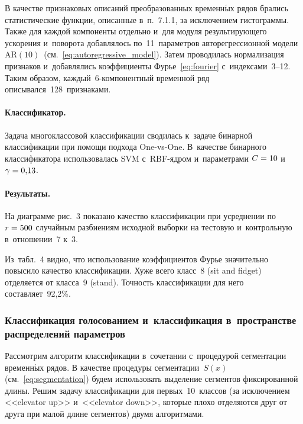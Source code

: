 \begin{multicols}{2}
В качестве признаковых описаний преобразованных временн$\acute{\mbox{ы}}$х рядов брались 
статистические функции, описанные в~п.~7.1.1, 
за исключением гистограммы.
Также для каждой компоненты отдельно и~для модуля результирующего 
ускорения и~поворота добавлялось по~11~параметров авторегрессионной 
модели~$\text{AR}(10)$~(см.~\eqref{eq:autoregressive_model}).
Затем проводилась нормализация признаков и~добавлялись коэффициенты 
Фурье~\eqref{eq:fourier} с~индексами~3--12.
Таким образом, каждый~6-ком\-по\-нент\-ный временной ряд описывался~128~признаками.

\vspace*{-12pt}

\paragraph*{Классификатор.}
Задача многоклассовой классификации сводилась к~задаче бинарной 
классификации при помощи подхода One-vs-One.
В~качестве бинарного классификатора использовалась SVM с~RBF-яд\-ром и~параметрами 
$C\hm=10$ и~$\gamma\hm=0{,}13$.


\paragraph*{Результаты.}
На диаграмме рис.~3 показано качество классификации 
при усреднении по $r\hm=500$ случайным разбиениям исходной выборки на тес\-то\-вую 
и~контрольную в~отношении~7 к~3.






Из~табл.~4 видно, что использование коэффициентов Фурье значительно повысило 
качество классификации.
Хуже всего класс~8 (sit and fidget) отделяется от класса~9 (stand).
Точность классификации для него составляет~92,2\%.

\vspace*{-6pt}


\subsubsection{Классификация голосованием и~классификация в~пространстве 
распределений параметров}

\vspace*{-2pt}

Рассмотрим алгоритм классификации в~сочетании с~процедурой сегментации временн$\acute{\mbox{ы}}$х 
рядов.
В качестве процедуры сегментации~$S(x)$ (см.~\eqref{eq:segmentation}) 
будем использовать выделение сегментов фиксированной длины.
Решим задачу классификации для первых~10~классов (за исключением <<elevator up>> 
и~<<elevator down>>, которые плохо отделяются друг от друга при малой длине сегментов) 
двумя алгоритмами.


\end{multicols}
